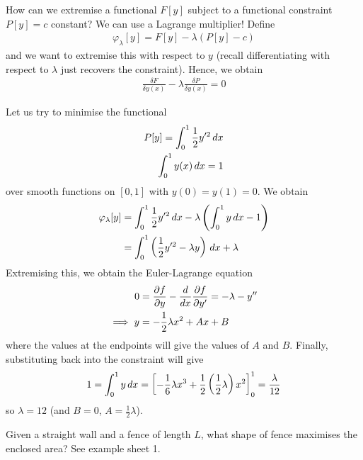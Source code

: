\documentclass{../template/note}
\begin{document}
    How can we extremise a functional $F[y]$ subject to a functional constraint $P[y] = c$ constant? We can use a Lagrange multiplier! Define
    \begin{align*}
        \varphi_\lambda[y] = F[y] - \lambda(P[y]-c)
    \end{align*}
    and we want to extremise this with respect to $y$ (recall differentiating with respect to $\lambda$ just recovers the constraint). Hence, we obtain
    \begin{align*}
        \frac{\delta F}{\delta y(x)} - \lambda \frac{\delta P}{\delta y(x)} = 0
    \end{align*}

    \begin{example*}
        Let us try to minimise the functional
        \begin{align*}
            P[y] = \int_0^1 \frac 1 2 y'^2 \,d{x} \\
            \int_0^1 y(x) \,d{x} = 1
        \end{align*}
        over smooth functions on $[0, 1]$ with $y(0) = y(1) = 0$. We obtain
        \begin{align*}
            \varphi_\lambda[y] &= \int_0^1 \frac 1 2 y'^2 \,d{x} - \lambda \left(\int_0^1 y \,d{x} - 1\right) \\
            &= \int_0^1 \left(\frac 1 2 y'^2 - \lambda y\right) \,d{x} + \lambda
        \end{align*}
        Extremising this, we obtain the Euler-Lagrange equation
        \begin{align*}
            0 &= \pd{f}{y} - \frac{d}{dx} \pd{f}{y'} = -\lambda - y'' \\
            \implies y &= - \frac 1 2 \lambda x^2 + Ax + B
        \end{align*}
        where the values at the endpoints will give the values of $A$ and $B$. Finally, substituting back into the constraint will give
        \begin{align*}
            1 = \int_0^1 y \,d{x} = \left[-\frac 1 6 \lambda x^3 + \frac 1 2\left(\frac 1 2 \lambda\right) x^2\right]_0^1 = \frac{\lambda}{12}
        \end{align*}
        so $\lambda = 12$ (and $B = 0$, $A = \frac 1 2 \lambda$).           
    \end{example*}
    
    \begin{example*}
        Given a straight wall and a fence of length $L$, what shape of fence maximises the enclosed area? See example sheet 1.
    \end{example*}
\end{document}
